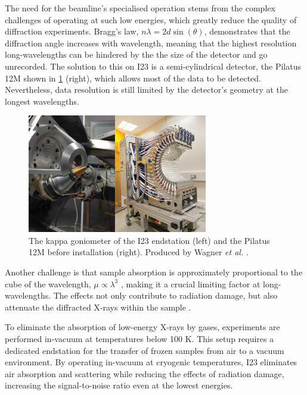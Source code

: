 The need for the beamline's specialised operation stems from the complex challenges of operating at such low energies, which greatly reduce the quality of diffraction experiments.
Bragg’s law, $nλ = 2d \sin(\theta)$, demonstrates that the diffraction angle increases with wavelength, meaning that the highest resolution long-wavelengths can be hindered by the the size of the detector and go unrecorded. %
The solution to this on I23 is a semi-cylindrical detector, the Pilatus 12M shown in \cref{fig:gonio_and_detector} (right), which allows most of the data to be detected. Nevertheless, data resolution is still limited by the detector’s geometry at the longest wavelengths.

\begin{figure}
    \centering
    \includegraphics[width = 0.7\textwidth]{images/goniometer&detector.PNG}
    \caption{The kappa goniometer of the I23 endstation (left) and the Pilatus 12M before installation (right). Produced by Wagner \textit{et al.} \cite{Wagner2016}.}
    \label{fig:gonio_and_detector}
\end{figure}

 Another challenge is that sample absorption is approximately proportional to the cube of the wavelength, $\mu \propto \lambda^3$ \cite{Arndt1984}, making it a crucial limiting factor at long-wavelengths. The effects not only contribute to radiation damage, but also attenuate the diffracted X-rays within the sample \cite{Wagner2016}.

To eliminate the absorption of low-energy X-rays by gases, experiments are performed in-vacuum at temperatures below 100 K. This setup requires a dedicated endstation for the transfer of frozen samples from air to a vacuum environment. By operating in-vacuum at cryogenic temperatures, I23 eliminates air absorption and scattering while reducing the effects of radiation damage, increasing the signal-to-noise ratio even at the lowest energies.

